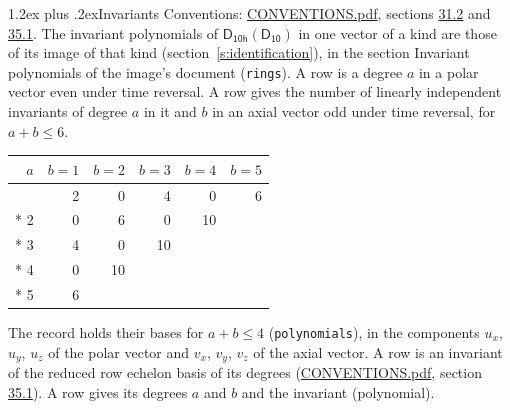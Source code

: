 \documentclass[10pt,a4paper]{article}
\makeatletter
\renewcommand\section{\@startsection{section}{1}{\z@}{-3ex plus -1ex minus -.2ex}%
  {1.2ex plus .2ex}{\normalfont\large\sffamily\bfseries\color{parttitle}}}
\numberwithin{equation}{section}
\newcommand{\grp}[1]{\mathsf{#1}}
\makeatother
\begin{document}
\section{Invariants}\label{s:invariants}
Conventions: \href{../../CONVENTIONS.pdf}{CONVENTIONS.pdf}, sections \href{../../CONVENTIONS.pdf\#conv.31.2}{31.2} and \href{../../CONVENTIONS.pdf\#conv.35.1}{35.1}.
The invariant polynomials of $\grp{D_{10h}}(\grp{D_{10}})$ in one vector of a kind are those of its image of that kind (section~\ref{s:identification}), in the section Invariant polynomials of the image's document (\texttt{rings}).
\leavevmode\label{n:index.degree.polar}\label{n:index.degree.axial}A row is a degree $a$ in a polar vector even under time reversal. A row gives the number of linearly independent invariants of degree $a$ in it and $b$ in an axial vector odd under time reversal, for $a + b \le 6$.
{\small\begin{longtable}{@{}rrrrrr@{}}\toprule
$a$ & $b = 1$ & $b = 2$ & $b = 3$ & $b = 4$ & $b = 5$\\\midrule\endhead
\bottomrule\endfoot\endlastfoot
1 & 2 & 0 & 4 & 0 & 6\\*
2 & 0 & 6 & 0 & 10 & \\*
3 & 4 & 0 & 10 &  & \\*
4 & 0 & 10 &  &  & \\*
5 & 6 &  &  &  & \\
\bottomrule\end{longtable}}
\leavevmode\label{n:local.component.polar}\label{n:local.component.axial}The record holds their bases for $a + b \le 4$ (\texttt{polynomials}), in the components $u_{x}$, $u_{y}$, $u_{z}$ of the polar vector and $v_{x}$, $v_{y}$, $v_{z}$ of the axial vector. \label{n:head.polynomial}A row is an invariant of the reduced row echelon basis of its degrees (\href{../../CONVENTIONS.pdf}{CONVENTIONS.pdf}, section \href{../../CONVENTIONS.pdf\#conv.35.1}{35.1}). A row gives its degrees $a$ and $b$ and the invariant (polynomial).
\end{document}
